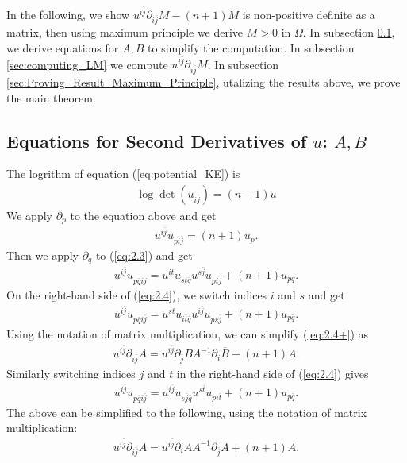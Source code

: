 \documentclass{article}
\numberwithin{equation}{section}
\newcommand{\ijbar}{{i\overline j}}
\newcommand{\jbar}{{\overline{j}}}
\newcommand{\tbar}{{\overline{t}}}
\newcommand{\Abarinverse}{\overline{A^{-1}}}
\newcommand{\Ainverse}{{A^{-1}}}
\newcommand{\qbar}{{\overline{q}}}
\newcommand{\partiali}{\partial_i}
\newcommand{\partialjbar}{\partial_{\overline j}}
\begin{document}
   In the following, we show $u^{\ijbar}{\partial_{\ijbar}} M-(n+1)M$ is non-positive definite as a matrix, then using maximum principle we derive $M>0$ in $\Omega$.  In subsection \ref{sec:eq_for_AB}, we derive equations for $A, B$ to simplify the computation.  
   In subsection \ref{sec:computing_LM} we compute $u^{\ijbar}{\partial_{\ijbar}} M$. In subsection \ref{sec:Proving_Result_Maximum_Principle}, utalizing the results above, we prove the main theorem.
\subsection{Equations for Second Derivatives of $u$: $A, B$}
\label{sec:eq_for_AB}
The logrithm of equation (\ref{eq:potential_KE}) is
\begin{align}
	\log\det(u_{\ijbar})=(n+1)u
	\label{eq:2.2}
\end{align}
We apply $\partial_p$ to the equation above and get
\begin{align}
	u^{\ijbar}u_{p\ijbar}=(n+1)u_p.
	\label{eq:2.3}
\end{align}
Then we apply $\partial_{\qbar}$ to (\ref{eq:2.3}) and get
 \begin{align}
 	u^{\ijbar}{u_{p\qbar\ijbar}}=u^{i\overline t}u_{s\overline t \qbar} u^{s\jbar} u_{p\ijbar}+(n+1) u_{p\qbar}.
 	\label{eq:2.4}
 \end{align}
 On the right-hand side of (\ref{eq:2.4}), we switch indices $i$ and $s$ and get
  \begin{align}
 	u^{\ijbar}{u_{p\qbar\ijbar}}=u^{s\tbar}u_{i\tbar\qbar}u^{\ijbar} u_{ps\jbar}+(n+1) u_{p\qbar}.
 	\label{eq:2.4+}
 \end{align}  Using the notation of matrix multiplication, we can simplify (\ref{eq:2.4+}) as
 \begin{align}
 	u^{\ijbar} \partial_{\ijbar}A=u^{\ijbar}\partialjbar B \Abarinverse \partiali\overline{B}+(n+1)A.
 	\label{eq:DDA_BB}
 \end{align}
 Similarly switching indices  $j$  and $t$ in the  right-hand side of (\ref{eq:2.4}) gives
  \begin{align}
 	u^{\ijbar}{u_{p\qbar\ijbar}}=u^{i\overline j}u_{s\overline j \qbar} u^{s\tbar} u_{p i\tbar}+(n+1) u_{p\qbar}.
 	\label{eq:2.4++}
 \end{align} The above can be simplified to the following, using the notation of matrix multiplication:
 \begin{align}
 	u^{\ijbar} \partial_{\ijbar}A=u^{\ijbar}\partiali A \Ainverse \partialjbar A+(n+1)A.
 \label{eq:DDA_AA}
 \end{align}
\end{document}
